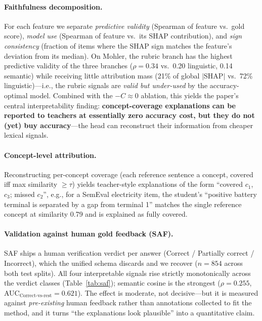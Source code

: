 \documentclass[11pt]{article}
\begin{document}
\paragraph{Faithfulness decomposition.}
For each feature we separate \emph{predictive validity} (Spearman of feature
vs.\ gold score), \emph{model use} (Spearman of feature vs.\ its SHAP
contribution), and \emph{sign consistency} (fraction of items where the SHAP
sign matches the feature's deviation from its median). On Mohler, the rubric
branch has the highest predictive validity of the three branches
($\rho{=}0.34$ vs.\ 0.20 linguistic, 0.14 semantic) while receiving little
attribution mass (21\% of global $|$SHAP$|$ vs.\ 72\% linguistic)---i.e., the
rubric signals are \emph{valid but under-used} by the accuracy-optimal model.
Combined with the $-C\!\approx\!0$ ablation, this yields the paper's central
interpretability finding: \textbf{concept-coverage explanations can be reported
to teachers at essentially zero accuracy cost, but they do not (yet) buy
accuracy}---the head can reconstruct their information from cheaper lexical
signals.

\paragraph{Concept-level attribution.}
Reconstructing per-concept coverage (each reference sentence a concept,
covered iff max similarity $\ge\tau$) yields teacher-style explanations of the
form ``covered $c_1$, $c_3$; missed $c_2$'', e.g., for a SemEval electricity
item, the student's ``positive battery terminal is separated by a gap from
terminal 1'' matches the single reference concept at similarity 0.79 and is
explained as fully covered.

\paragraph{Validation against human gold feedback (SAF).}
SAF ships a human verification verdict per answer
(Correct / Partially correct / Incorrect), which the unified schema discards
and we recover ($n{=}854$ across both test splits). All four interpretable
signals rise strictly monotonically across the verdict classes
(Table~\ref{tab:saf}); semantic cosine is the strongest
($\rho{=}0.255$, AUC${}_{\text{Correct-vs-rest}}{=}0.621$). The effect is
moderate, not decisive---but it is measured against \emph{pre-existing} human
feedback rather than annotations collected to fit the method, and it turns
``the explanations look plausible'' into a quantitative claim.
\end{document}
